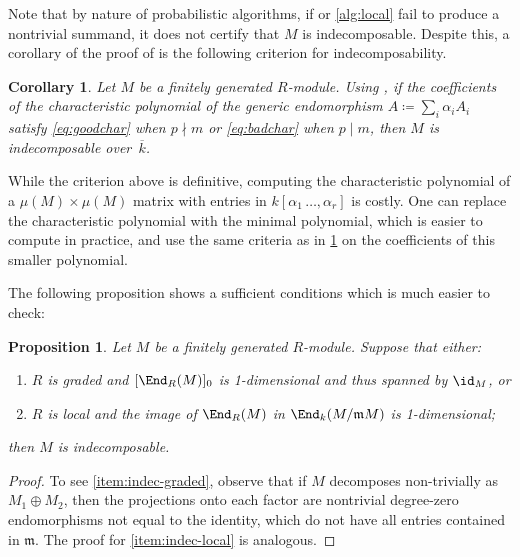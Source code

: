 \documentclass[12pt]{amsart}
\let\bar\overline
\def\m{\mathfrak m}
\theoremstyle{theorem}
\numberwithin{thm}{section}
\newtheorem{cor}[thm]{Corollary}
\newtheorem{prop}[thm]{Proposition}
\theoremstyle{definition}
\begin{document}
Note that by nature of probabilistic algorithms, if  or \ref{alg:local} fail to produce a nontrivial summand, it does not certify that $M$ is indecomposable. Despite this, a corollary of the proof of  is the following criterion for indecomposability.

\begin{cor}\label{cor:generic}
  Let $M$ be a finitely generated $R$-module. Using , if the coefficients of the characteristic polynomial of the generic endomorphism $A \coloneqq \sum_i \alpha_i A_i$ satisfy \eqref{eq:goodchar} when $p\nmid m$ or \eqref{eq:badchar} when $p\mid m$,
 then $M$ is indecomposable over~$\bar k$.
\end{cor}

While the criterion above is definitive, computing the characteristic polynomial of a $\mu(M)\times\mu(M)$ matrix with entries in $k[\alpha_1\,\dots,\alpha_r]$ is costly.
One can replace the characteristic polynomial with the minimal polynomial, which is easier to compute in practice, and use the same criteria as in \cref{cor:generic} on the coefficients of this smaller polynomial.

The following proposition shows a sufficient conditions which is much easier to check:

\begin{prop}\label{prop:indecomposability}
  Let $M$ be a finitely generated $R$-module. Suppose that either:
  \begin{enumerate}

  \item\label{item:indec-graded} $R$ is graded and $[\End_R(M)]_0$ is 1-dimensional and thus spanned by $\id_M$, or
  \item\label{item:indec-local} $R$ is local and the image of $\End_R(M)$ in $\End_k(M/\m M)$ is 1-dimensional;
  \end{enumerate}
  then $M$ is indecomposable.
\end{prop}
\begin{proof}
  To see \eqref{item:indec-graded}, observe that if $M$ decomposes non-trivially as $M_1\oplus M_2$, then the projections onto each factor are nontrivial degree-zero endomorphisms not equal to the identity, which do not have all entries contained in $\m$. The proof for \eqref{item:indec-local} is analogous.
\end{proof}
\end{document}
